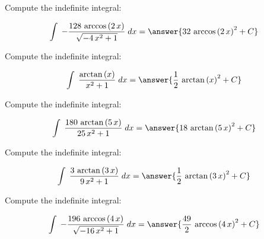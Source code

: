 \documentclass[]{ximera}
\begin{document}

\renewcommand{\latexProblemContent}[1]{#1}



\latexProblemContent{
\begin{problem}

Compute the indefinite integral:



\[\int\;{-\frac{128 \, \arccos\left(2 \, x\right)}{\sqrt{-4 \, x^{2} + 1}}}\;dx = \answer{{32 \, \arccos\left(2 \, x\right)^{2}}+C}\]
\end{problem}}%



\latexProblemContent{
\begin{problem}

Compute the indefinite integral:



\[\int\;{\frac{\arctan\left(x\right)}{x^{2} + 1}}\;dx = \answer{{\frac{1}{2} \, \arctan\left(x\right)^{2}}+C}\]
\end{problem}}%



\latexProblemContent{
\begin{problem}

Compute the indefinite integral:



\[\int\;{\frac{180 \, \arctan\left(5 \, x\right)}{25 \, x^{2} + 1}}\;dx = \answer{{18 \, \arctan\left(5 \, x\right)^{2}}+C}\]
\end{problem}}%



\latexProblemContent{
\begin{problem}

Compute the indefinite integral:



\[\int\;{\frac{3 \, \arctan\left(3 \, x\right)}{9 \, x^{2} + 1}}\;dx = \answer{{\frac{1}{2} \, \arctan\left(3 \, x\right)^{2}}+C}\]
\end{problem}}%



\latexProblemContent{
\begin{problem}

Compute the indefinite integral:



\[\int\;{-\frac{196 \, \arccos\left(4 \, x\right)}{\sqrt{-16 \, x^{2} + 1}}}\;dx = \answer{{\frac{49}{2} \, \arccos\left(4 \, x\right)^{2}}+C}\]
\end{problem}}%
\end{document}
